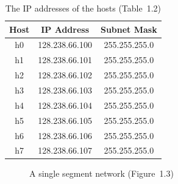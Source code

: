 \documentclass{UTNetLab}
\begin{document}
    \begin{minipage}{0.48\textwidth}
        \begin{flushleft}
            \begin{table}[H]
                \caption{The IP addresses of the hosts (Table~1.2)}
                \label{tab:1.2}
                \centering
                \begin{tabular}{ c c c }
                    \hline \hline
                    Host & IP Address & Subnet Mask \\
                    \hline 
                    h0 & 128.238.66.100 & 255.255.255.0 \\
                    h1 & 128.238.66.101 & 255.255.255.0 \\
                    h2 & 128.238.66.102 & 255.255.255.0 \\
                    h3 & 128.238.66.103 & 255.255.255.0 \\
                    h4 & 128.238.66.104 & 255.255.255.0 \\
                    h5 & 128.238.66.105 & 255.255.255.0 \\
                    h6 & 128.238.66.106 & 255.255.255.0 \\
                    h7 & 128.238.66.107 & 255.255.255.0 \\
                    \hline \hline
                    \end{tabular}
            \end{table}
        \end{flushleft}
    \end{minipage}
    \begin{minipage}{0.48\textwidth}
        \begin{flushright}
            \begin{figure}[H]
                \centering
                \caption{A single segment network (Figure~1.3)}
                \label{fig:1.3}
            \end{figure}
        \end{flushright}
    \end{minipage}
\end{document}
